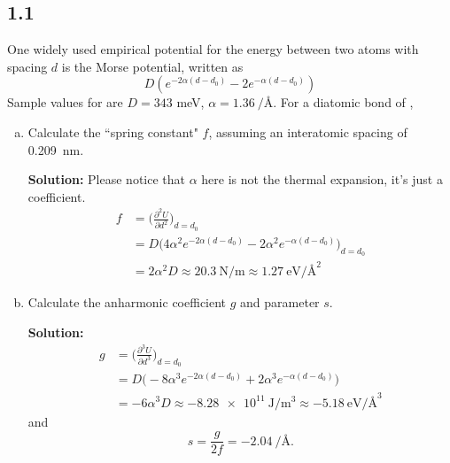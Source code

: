\documentclass[12pt]{article}
\begin{document}
\subsection{1.1}
One widely used empirical potential for the energy between two atoms with
spacing $d$ is the Morse potential, written as
\begin{equation}
	D(e^{-2\alpha(d - d_0)} - 2e^{-\alpha (d - d_0)})
\end{equation}
Sample values for  are $D = 343$ meV, $\alpha = \SI{1.36}{\per\angstrom}$.
For a diatomic bond of ,
\begin{enumerate}[(a)]
	\item Calculate the ``spring constant" $f$, assuming an interatomic spacing of \SI{0.209}{\nano\meter}.

	      \textbf{Solution:}
	      Please notice that $\alpha$ here is not the thermal expansion, it's just a coefficient.
	      \begin{equation}
		      \begin{split}
			      f &= \Big( \frac{ \partial^2 U }{ \partial d^2 } \Big)_{ d = d_0 } \\
			      &= D \Big( 4 \alpha^2 e^{-2\alpha(d - d_0)} - 2 \alpha^2 e^{-\alpha(d - d_0)} \Big)_{ d = d_0 } \\
			      &= 2 \alpha^2 D \approx \SI{20.3}{\newton\per\meter} \approx \SI{1.27}{\electronvolt\per\square\angstrom}
		      \end{split}
	      \end{equation}

	\item Calculate the anharmonic coefficient $g$ and parameter $s$.

	      \textbf{Solution:}
	      \begin{equation}
		      \begin{split}
			      g &= \Big( \frac{ \partial^3 U }{ \partial d^3 } \Big)_{ d = d_0 } \\
			      &= D \Big( -8 \alpha^3 e^{-2\alpha(d - d_0)} + 2 \alpha^3 e^{-\alpha(d - d_0)} \Big) \\
			      &= -6 \alpha^3 D \approx \SI{-8.28e11}{\joule\per\cubic\meter} \approx \SI{-5.18}{\electronvolt\per\cubic\angstrom}
		      \end{split}
	      \end{equation}
	      and \begin{equation}
		      s = \frac{g}{2 f} = \SI{-2.04}{\per\angstrom}.
	      \end{equation}


\end{enumerate}
\end{document}
